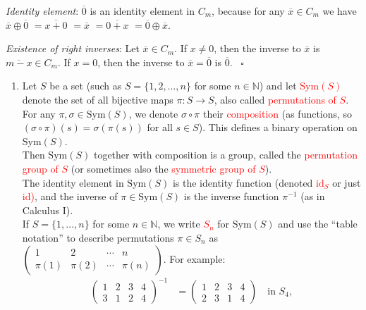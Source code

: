 \documentclass[
  12pt,
  a4paper,
  twoside]{article}
\providecommand{\tightlist}{%
  \setlength{\itemsep}{0pt}\setlength{\parskip}{0pt}}
\theoremstyle{plain}
\theoremstyle{definition}
\begin{document}
\emph{Identity element}: \(\overline{0}\) is an identity element in \(C_m\), because for any \(\overline{x}\in C_m\) we have \(\overline{x}\oplus\overline{0}\) \(=\overline{x+0}\) \(=\overline{x}\) \(=\overline{0+x}\) \(=\overline{0}\oplus\overline{x}\).

\emph{Existence of right inverses}: Let \(\overline{x}\in C_m\). If \(x\neq0\), then the inverse to \(\overline{x}\) is \(\overline{m-x}\in C_m\). If \(x=0\), then the inverse to \(\overline{x}=\overline{0}\) is \(\overline{0}\).
\hfill~{\(\square\)}

\begin{enumerate}
\def\labelenumi{(\alph{enumi})}
\setcounter{enumi}{2}
\tightlist
\item
  Let \(S\) be a set (such as \(S=\{1,2,\dots,n\}\) for some \(n\in\mathbb{N}\)) and let \textcolor{red}{$\mathrm{Sym}(S)$} denote the set of all bijective maps \(\pi : S\to S\), also called \textcolor{red}{permutations of $S$}.\\
  For any \(\pi, \sigma\in \mathrm{Sym}(S)\), we denote \(\sigma\circ\pi\) their \textcolor{red}{composition} (as functions, so \((\sigma\circ\pi)(s) = \sigma(\pi(s))\) for all \(s\in S\)). This defines a binary operation on \(\mathrm{Sym}(S)\).\\
  Then \(\mathrm{Sym}(S)\) together with composition is a group, called the \textcolor{red}{permutation group of $S$} (or sometimes also the \textcolor{red}{symmetric group of $S$}).\\
  The identity element in \(\mathrm{Sym}(S)\) is the identity function (denoted \textcolor{red}{$\mathrm{id}_S$} or just \textcolor{red}{$\mathrm{id}$)}, and the inverse of \(\pi\in\mathrm{Sym}(S)\) is the inverse function \(\pi^{-1}\) (as in Calculus I).\\
  If \(S=\{1,\dots,n\}\) for some \(n\in\mathbb{N}\), we write \textcolor{red}{$S_n$} for \(\mathrm{Sym}(S)\) and use the ``table notation'' to describe permutations \(\pi\in S_n\) as \(\left(\begin{smallmatrix}1&2&\cdots&n\\\pi(1)&\pi(2)&\cdots&\pi(n)\end{smallmatrix}\right)\). For example:
  \begin{align*}
  \begin{pmatrix}1&2&3&4\\3&1&2&4\end{pmatrix}^{-1} &=
  \begin{pmatrix}1&2&3&4\\2&3&1&4\end{pmatrix}\quad\text{in }S_4,\\

\end{align*}
\end{enumerate}
\end{document}
